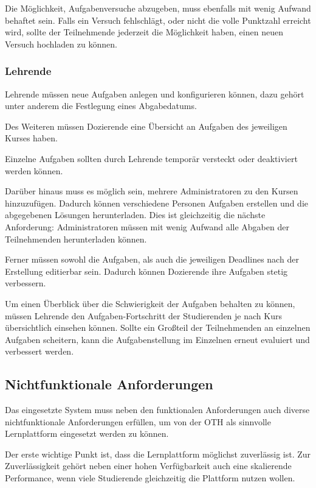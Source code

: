 Die Möglichkeit, Aufgabenversuche abzugeben, muss ebenfalls mit wenig Aufwand
behaftet sein. Falls ein Versuch fehlschlägt, oder nicht die volle Punktzahl
erreicht wird, sollte der Teilnehmende jederzeit die Möglichkeit haben, einen
neuen Versuch hochladen zu können.

\subsubsection{Lehrende}\label{anforderungsanalyse-funktional-lehrende}
Lehrende müssen neue Aufgaben anlegen und konfigurieren können, dazu gehört
unter anderem die Festlegung eines Abgabedatums.

Des Weiteren müssen Dozierende eine Übersicht an Aufgaben des jeweiligen Kurses
haben.

Einzelne Aufgaben sollten durch Lehrende temporär versteckt oder deaktiviert
werden können.

Darüber hinaus muss es möglich sein, mehrere Administratoren zu den Kursen
hinzuzufügen. Dadurch können verschiedene Personen Aufgaben erstellen und die
abgegebenen Lösungen herunterladen. Dies ist gleichzeitig die nächste
Anforderung: Administratoren müssen mit wenig Aufwand alle Abgaben der
Teilnehmenden herunterladen können.

Ferner müssen sowohl die Aufgaben, als auch die jeweiligen Deadlines nach der
Erstellung editierbar sein. Dadurch können Dozierende ihre Aufgaben stetig
verbessern.

Um einen Überblick über die Schwierigkeit der Aufgaben behalten zu können,
müssen Lehrende den Aufgaben-Fortschritt der Studierenden je nach Kurs
übersichtlich einsehen können. Sollte ein Großteil der Teilnehmenden an
einzelnen Aufgaben scheitern, kann die Aufgabenstellung im Einzelnen erneut
evaluiert und verbessert werden.

\subsection{Nichtfunktionale Anforderungen}
\label{anforderungsanalyse-nichtfunktional}
Das eingesetzte System muss neben den funktionalen Anforderungen auch diverse
nichtfunktionale Anforderungen erfüllen, um von der OTH als sinnvolle
Lernplattform eingesetzt werden zu können.

Der erste wichtige Punkt ist, dass die Lernplattform möglichst zuverlässig ist.
Zur Zuverlässigkeit gehört neben einer hohen Verfügbarkeit auch eine skalierende
Performance, wenn viele Studierende gleichzeitig die Plattform nutzen wollen.

